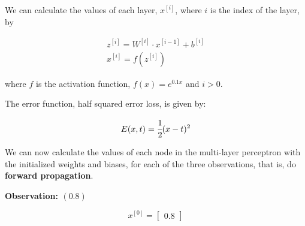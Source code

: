 \documentclass[12pt]{article}
\begin{document}
\begin{enumerate}[leftmargin=\labelsep]
          We can calculate the values of each layer, $x^{[i]}$, where $i$ is the
          index of the layer, by

          $$
              \begin{array}{c}
                  z^{[i]} = W^{[i]} \cdot x^{[i-1]} + b^{[i]} \\
                  x^{[i]} = f(z^{[i]})
              \end{array}
          $$

          where $f$ is the activation function, $f(x) = e^{0.1x}$ and $i > 0$.

          The error function, half squared error loss, is given by:

          $$
              E(x, t) = \cfrac{1}{2}(x - t)^2
          $$

          \vspace*{0.5cm}

          We can now calculate the values of each node in the multi-layer perceptron
          with the initialized weights and biases, for each of the three observations,
          that is, do \textbf{forward propagation}.

          \vspace*{0.5cm}

          \begin{paracol}{3}
              \begin{center}
                  \textbf{Observation: $(0.8)$}
              \end{center}

              $$
                  x^{[0]} = \begin{bmatrix}
                      0.8
                  \end{bmatrix}
              $$


\end{paracol}
\end{enumerate}
\end{document}
